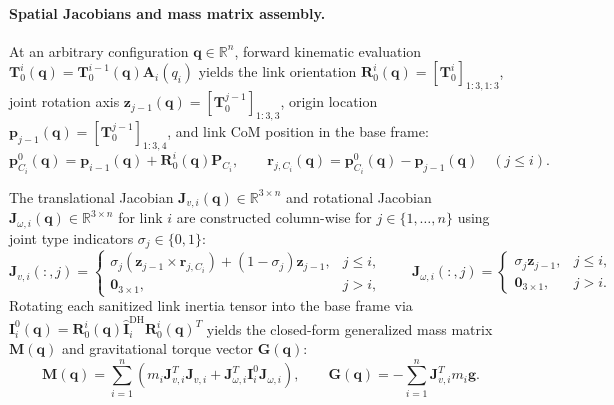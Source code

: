 \documentclass[fleqn,10pt]{article}
\begin{document}
	\paragraph{Spatial Jacobians and mass matrix assembly.}
	At an arbitrary configuration $\bm{q} \in \mathbb{R}^n$, forward kinematic evaluation $\bm{T}_0^i(\bm{q}) = \bm{T}_0^{i-1}(\bm{q})\bm{A}_i(q_i)$ yields the link orientation $\bm{R}_0^i(\bm{q}) = [\bm{T}_0^i]_{1:3,1:3}$, joint rotation axis $\bm{z}_{j-1}(\bm{q}) = [\bm{T}_0^{j-1}]_{1:3,3}$, origin location $\bm{p}_{j-1}(\bm{q}) = [\bm{T}_0^{j-1}]_{1:3,4}$, and link CoM position in the base frame:
	\begin{equation}
		\bm{p}_{C_i}^0(\bm{q}) = \bm{p}_{i-1}(\bm{q}) + \bm{R}_0^i(\bm{q})\bm{P}_{C_i}, \qquad \bm{r}_{j,C_i}(\bm{q}) = \bm{p}_{C_i}^0(\bm{q}) - \bm{p}_{j-1}(\bm{q}) \quad (j \le i).
		\label{eq:com_forward}
	\end{equation}
	
	The translational Jacobian $\bm{J}_{v,i}(\bm{q}) \in \mathbb{R}^{3 \times n}$ and rotational Jacobian $\bm{J}_{\omega,i}(\bm{q}) \in \mathbb{R}^{3 \times n}$ for link $i$ are constructed column-wise for $j \in \{1, \dots, n\}$ using joint type indicators $\sigma_j \in \{0, 1\}$:
	\begin{equation}
		\bm{J}_{v,i}(:,j) = \begin{cases}
			\sigma_j \left(\bm{z}_{j-1} \times \bm{r}_{j,C_i}\right) + (1 - \sigma_j)\bm{z}_{j-1}, & j \le i, \\
			\bm{0}_{3 \times 1}, & j > i,
		\end{cases} \qquad
		\bm{J}_{\omega,i}(:,j) = \begin{cases}
			\sigma_j \bm{z}_{j-1}, & j \le i, \\
			\bm{0}_{3 \times 1}, & j > i.
		\end{cases}
		\label{eq:link_jacobians}
	\end{equation}
	Rotating each sanitized link inertia tensor into the base frame via $\bm{I}_i^0(\bm{q}) = \bm{R}_0^i(\bm{q}) \hat{\bm{I}}_i^{\text{DH}} \bm{R}_0^i(\bm{q})^T$ yields the closed-form generalized mass matrix $\bm{M}(\bm{q})$ and gravitational torque vector $\bm{G}(\bm{q})$:
	\begin{equation}
		\bm{M}(\bm{q}) = \sum_{i=1}^n \left( m_i \bm{J}_{v,i}^T \bm{J}_{v,i} + \bm{J}_{\omega,i}^T \bm{I}_i^0 \bm{J}_{\omega,i} \right), \qquad 
		\bm{G}(\bm{q}) = -\sum_{i=1}^n \bm{J}_{v,i}^T m_i \bm{g}.
		\label{eq:M_and_G}
	\end{equation}
	
\end{document}

